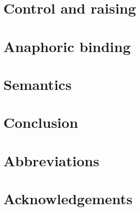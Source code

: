 \documentclass[output=paper
                ,modfonts
                ,nonflat
	        ,collection
	        ,collectionchapter
	        ,collectiontoclongg
 	        ,biblatex
                ,babelshorthands
                ,newtxmath
                ,draftmode
                ,colorlinks, citecolor=brown
]{./langsci/langscibook}
\begin{document}
\section{Control and raising}

\section{Anaphoric binding}

\section{Semantics}

\section{Conclusion}

 
\section*{Abbreviations}
\section*{Acknowledgements}

\printbibliography[heading=subbibliography,notkeyword=this] 
\end{document}
